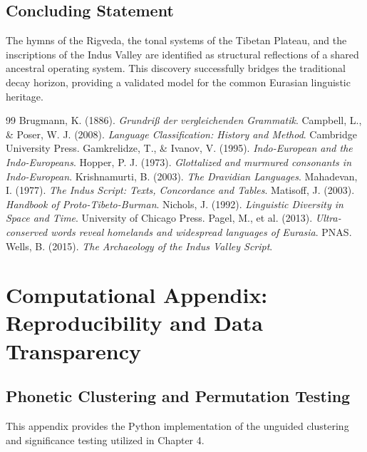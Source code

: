\documentclass[11pt,oneside,openany]{book}
\begin{document}
\section{Concluding Statement}
The hymns of the Rigveda, the tonal systems of the Tibetan Plateau, and the inscriptions of the Indus Valley are identified as structural reflections of a shared ancestral operating system. This discovery successfully bridges the traditional decay horizon, providing a validated model for the common Eurasian linguistic heritage.

\begin{thebibliography}{99}
\small
{} Brugmann, K. (1886). \textit{Grundriß der vergleichenden Grammatik}.
 Campbell, L., \& Poser, W. J. (2008). \textit{Language Classification: History and Method}. Cambridge University Press.
 Gamkrelidze, T., \& Ivanov, V. (1995). \textit{Indo-European and the Indo-Europeans}.
 Hopper, P. J. (1973). \textit{Glottalized and murmured consonants in Indo-European}.
 Krishnamurti, B. (2003). \textit{The Dravidian Languages}.
 Mahadevan, I. (1977). \textit{The Indus Script: Texts, Concordance and Tables}.
 Matisoff, J. (2003). \textit{Handbook of Proto-Tibeto-Burman}.
 Nichols, J. (1992). \textit{Linguistic Diversity in Space and Time}. University of Chicago Press.
 Pagel, M., et al. (2013). \textit{Ultra-conserved words reveal homelands and widespread languages of Eurasia}. PNAS.
 Wells, B. (2015). \textit{The Archaeology of the Indus Valley Script}.
\end{thebibliography}



\appendix
\chapter{Computational Appendix: Reproducibility and Data Transparency}

\section{Phonetic Clustering and Permutation Testing}
This appendix provides the Python implementation of the unguided clustering and significance testing utilized in Chapter 4. 
\end{document}
